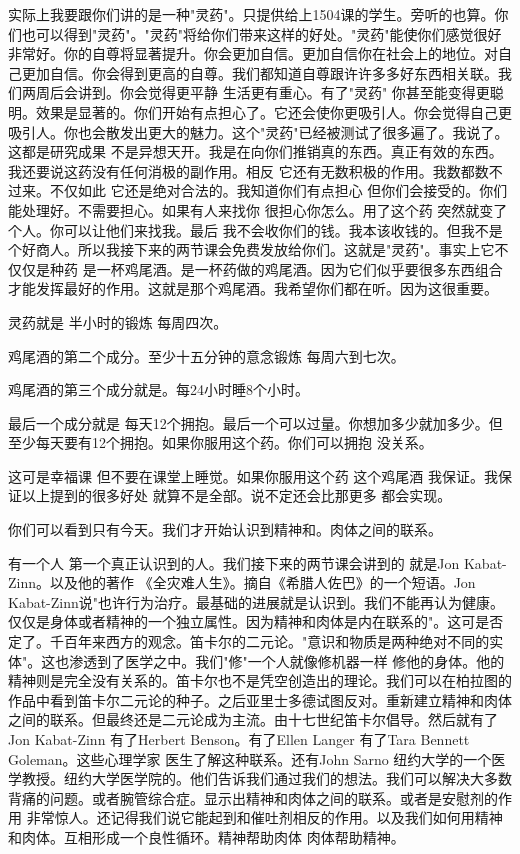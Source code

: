实际上我要跟你们讲的是一种"灵药"。只提供给上1504课的学生。旁听的也算。你们也可以得到"灵药"。"灵药"将给你们带来这样的好处。"灵药"能使你们感觉很好 非常好。你的自尊将显著提升。你会更加自信。更加自信你在社会上的地位。对自己更加自信。你会得到更高的自尊。我们都知道自尊跟许许多多好东西相关联。我们两周后会讲到。你会觉得更平静 生活更有重心。有了"灵药" 你甚至能变得更聪明。效果是显著的。你们开始有点担心了。它还会使你更吸引人。你会觉得自己更吸引人。你也会散发出更大的魅力。这个"灵药"已经被测试了很多遍了。我说了。这都是研究成果 不是异想天开。我是在向你们推销真的东西。真正有效的东西。我还要说这药没有任何消极的副作用。相反 它还有无数积极的作用。我数都数不过来。不仅如此 它还是绝对合法的。我知道你们有点担心 但你们会接受的。你们能处理好。不需要担心。如果有人来找你 很担心你怎么。用了这个药 突然就变了个人。你可以让他们来找我。最后 我不会收你们的钱。我本该收钱的。但我不是个好商人。所以我接下来的两节课会免费发放给你们。这就是"灵药"。事实上它不仅仅是种药 是一杯鸡尾酒。是一杯药做的鸡尾酒。因为它们似乎要很多东西组合才能发挥最好的作用。这就是那个鸡尾酒。我希望你们都在听。因为这很重要。 

灵药就是 半小时的锻炼 每周四次。 

鸡尾酒的第二个成分。至少十五分钟的意念锻炼 每周六到七次。 

鸡尾酒的第三个成分就是。每24小时睡8个小时。 

最后一个成分就是 每天12个拥抱。最后一个可以过量。你想加多少就加多少。但至少每天要有12个拥抱。如果你服用这个药。你们可以拥抱 没关系。 

这可是幸福课 但不要在课堂上睡觉。如果你服用这个药 这个鸡尾酒 我保证。我保证以上提到的很多好处 就算不是全部。说不定还会比那更多 都会实现。 

你们可以看到只有今天。我们才开始认识到精神和。肉体之间的联系。 

有一个人 第一个真正认识到的人。我们接下来的两节课会讲到的 就是Jon Kabat-Zinn。以及他的著作 《全灾难人生》。摘自《希腊人佐巴》的一个短语。Jon Kabat-Zinn说"也许行为治疗。最基础的进展就是认识到。我们不能再认为健康。仅仅是身体或者精神的一个独立属性。因为精神和肉体是内在联系的"。这可是否定了。千百年来西方的观念。笛卡尔的二元论。"意识和物质是两种绝对不同的实体"。这也渗透到了医学之中。我们"修"一个人就像修机器一样 修他的身体。他的精神则是完全没有关系的。笛卡尔也不是凭空创造出的理论。我们可以在柏拉图的作品中看到笛卡尔二元论的种子。之后亚里士多德试图反对。重新建立精神和肉体之间的联系。但最终还是二元论成为主流。由十七世纪笛卡尔倡导。然后就有了Jon Kabat-Zinn 有了Herbert Benson。有了Ellen Langer 有了Tara Bennett Goleman。这些心理学家 医生了解这种联系。还有John Sarno 纽约大学的一个医学教授。纽约大学医学院的。他们告诉我们通过我们的想法。我们可以解决大多数背痛的问题。或者腕管综合症。显示出精神和肉体之间的联系。或者是安慰剂的作用 非常惊人。还记得我们说它能起到和催吐剂相反的作用。以及我们如何用精神和肉体。互相形成一个良性循环。精神帮助肉体 肉体帮助精神。 

